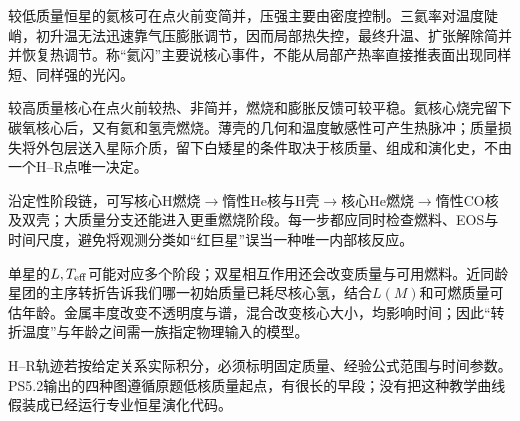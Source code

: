 较低质量恒星的氦核可在点火前变简并，压强主要由密度控制。三氦率对温度陡峭，初升温无法迅速靠气压膨胀调节，因而局部热失控，最终升温、扩张解除简并并恢复热调节。称“氦闪”主要说核心事件，不能从局部产热率直接推表面出现同样短、同样强的光闪。

较高质量核心在点火前较热、非简并，燃烧和膨胀反馈可较平稳。氦核心烧完留下碳氧核心后，又有氦和氢壳燃烧。薄壳的几何和温度敏感性可产生热脉冲；质量损失将外包层送入星际介质，留下白矮星的条件取决于核质量、组成和演化史，不由一个H--R点唯一决定。

沿定性阶段链，可写核心H燃烧$\to$惰性He核与H壳$\to$核心He燃烧$\to$惰性CO核及双壳；大质量分支还能进入更重燃烧阶段。每一步都应同时检查燃料、EOS与时间尺度，避免将观测分类如“红巨星”误当一种唯一内部核反应。

单星的$L,T_{\rm eff}$可能对应多个阶段；双星相互作用还会改变质量与可用燃料。近同龄星团的主序转折告诉我们哪一初始质量已耗尽核心氢，结合$L(M)$和可燃质量可估年龄。金属丰度改变不透明度与谱，混合改变核心大小，均影响时间；因此“转折温度”与年龄之间需一族指定物理输入的模型。

H--R轨迹若按给定关系实际积分，必须标明固定质量、经验公式范围与时间参数。PS5.2输出的四种图遵循原题低核质量起点，有很长的早段；没有把这种教学曲线假装成已经运行专业恒星演化代码。
